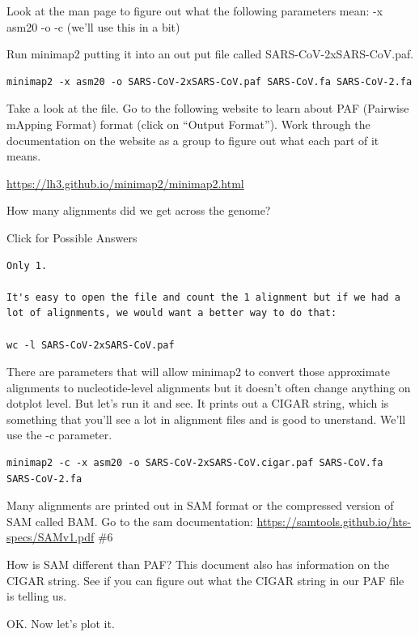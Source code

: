 \documentclass[
]{book}
\begin{document}
\hfill\break

Look at the man page to figure out what the following parameters mean:
-x asm20
-o
-c (we'll use this in a bit)

Run minimap2 putting it into an out put file called SARS-CoV-2xSARS-CoV.paf.

\begin{verbatim}
minimap2 -x asm20 -o SARS-CoV-2xSARS-CoV.paf SARS-CoV.fa SARS-CoV-2.fa
\end{verbatim}

Take a look at the file. Go to the following website to learn about PAF (Pairwise mApping Format) format (click on ``Output Format''). Work through the documentation on the website as a group to figure out what each part of it means.

\url{https://lh3.github.io/minimap2/minimap2.html}

How many alignments did we get across the genome?

Click for Possible Answers

\begin{verbatim}
Only 1.

It's easy to open the file and count the 1 alignment but if we had a lot of alignments, we would want a better way to do that:

wc -l SARS-CoV-2xSARS-CoV.paf
\end{verbatim}

\hfill\break

There are parameters that will allow minimap2 to convert those approximate alignments to nucleotide-level alignments but it doesn't often change anything on dotplot level. But let's run it and see. It prints out a CIGAR string, which is something that you'll see a lot in alignment files and is good to unerstand. We'll use the -c parameter.

\begin{verbatim}
minimap2 -c -x asm20 -o SARS-CoV-2xSARS-CoV.cigar.paf SARS-CoV.fa SARS-CoV-2.fa
\end{verbatim}

Many alignments are printed out in SAM format or the compressed version of SAM called BAM. Go to the sam documentation:
\url{https://samtools.github.io/hts-specs/SAMv1.pdf} \#6

How is SAM different than PAF? This document also has information on the CIGAR string. See if you can figure out what the CIGAR string in our PAF file is telling us.

OK. Now let's plot it.
\end{document}
